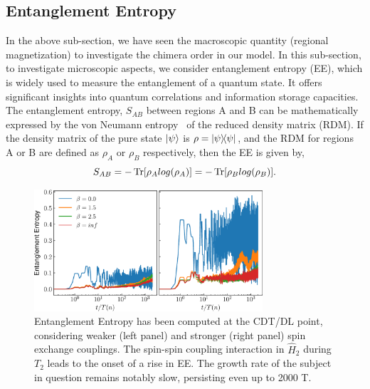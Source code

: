 \documentclass[%
nofootinbib,
reprint,
superscriptaddress,
amsmath,amssymb,showkeys,
aps,
prb,
]{revtex4-2}
\begin{document}
	\subsection{\label{sec:level41} Entanglement Entropy}
	In the above sub-section, we have seen the macroscopic quantity (regional magnetization) to investigate the chimera order in our model. In this sub-section, to investigate microscopic aspects, we consider entanglement entropy (EE), which is widely used to measure the entanglement of a quantum state. It offers significant insights into quantum correlations and information storage capacities. The entanglement entropy, $S_{AB}$ between regions A and B can be mathematically expressed by the von Neumann entropy~\cite{bayat_entanglement_2022,mendes-santos_measuring_2020} of the reduced density matrix (RDM).   If the density matrix of the pure state $\ket{\psi}$ is $\rho = \ketbra{\psi}$, and the RDM for regions A or B are defined as $\rho_A$ or $\rho_B$ respectively, then the EE is given by,
	\begin{equation} 
		S_{AB} = -\Tr[\rho_A log(\rho_A)] = -\Tr[\rho_B log(\rho_B)].
		\label{eq:vonentrop}
	\end{equation}	
	\begin{figure}
		\begin{center}
			\includegraphics[width=8.5cm]{entangEntrp.pdf}
		\end{center}
		\caption{Entanglement Entropy has been computed at the CDT/DL point, considering weaker (left panel) and stronger (right panel) spin exchange couplings. The spin-spin coupling interaction in $\hat{H}_2$ during $T_2$ leads to the onset of a rise in EE. The growth rate of the subject in question remains notably slow, persisting even up to 2000 T.}
		\label{Fig:entangle}
	\end{figure}
	
\end{document}
